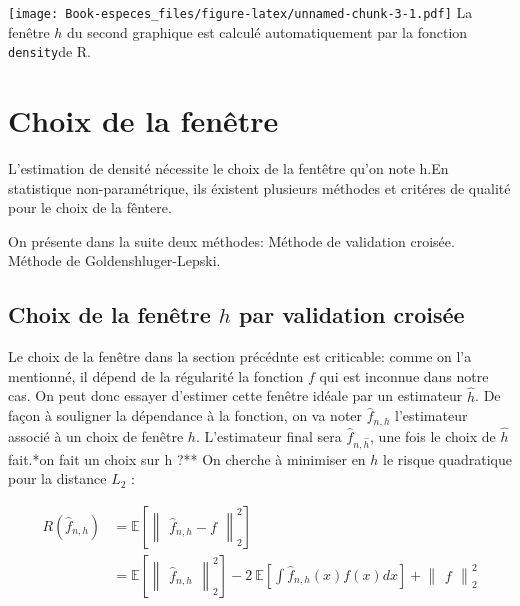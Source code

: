 \documentclass[
]{book}
\theoremstyle{definition}
\theoremstyle{definition}
\theoremstyle{definition}
\theoremstyle{definition}
\theoremstyle{remark}
\begin{document}
\texttt{[image: Book-especes\_files/figure-latex/unnamed-chunk-3-1.pdf]}
La fenêtre \(h\) du second graphique est calculé automatiquement par la fonction \texttt{density}de R.

\hypertarget{choix-de-la-fenuxeatre}{%
\section{Choix de la fenêtre}\label{choix-de-la-fenuxeatre}}

L'estimation de densité nécessite le choix de la fentêtre qu'on note h.\newline En statistique non-paramétrique, ils éxistent plusieurs méthodes et critéres de qualité pour le choix de la fêntere.\newline

On présente dans la suite deux méthodes:\newline
\hspace*{0.5cm} Méthode de validation croisée.\newline
\hspace*{0.5cm} Méthode de Goldenshluger-Lepski.\newline

\hypertarget{choix-de-la-fenuxeatre-h-par-validation-croisuxe9e}{%
\subsection{\texorpdfstring{Choix de la fenêtre \(h\) par validation croisée}{Choix de la fenêtre h par validation croisée}}\label{choix-de-la-fenuxeatre-h-par-validation-croisuxe9e}}

Le choix de la fenêtre dans la section précédnte est criticable: comme on l'a mentionné, il dépend de la régularité la fonction \(f\) qui est inconnue dans notre cas. On peut donc essayer d'estimer cette fenêtre idéale par un estimateur \(\hat{h}\). De façon à souligner la dépendance à la fonction, on va noter \(\hat{f}_{n,h}\) l'estimateur associé à un choix de fenêtre \(h\). L'estimateur final sera \(\hat{f}_{n,\hat{h}}\), une fois le choix de \(\hat{h}\) fait.\newline       **on fait un choix sur h ?**
On cherche à minimiser en \(h\) le risque quadratique pour la distance \(L_2\) :

\[
\begin{aligned}
R(\hat {f}_{n,h})&=\mathbb{E}[\begin{Vmatrix}\hat {f}_{n,h}-f\end{Vmatrix}_2^2]\\        
&= \mathbb{E}[\begin{Vmatrix}\hat {f}_{n,h}\end{Vmatrix}_2^2] -2~\mathbb{E}[\int \hat {f}_{n,h}(x)f(x)dx] +\begin{Vmatrix}f\end{Vmatrix}_2^2
\end{aligned}
\]
\end{document}
